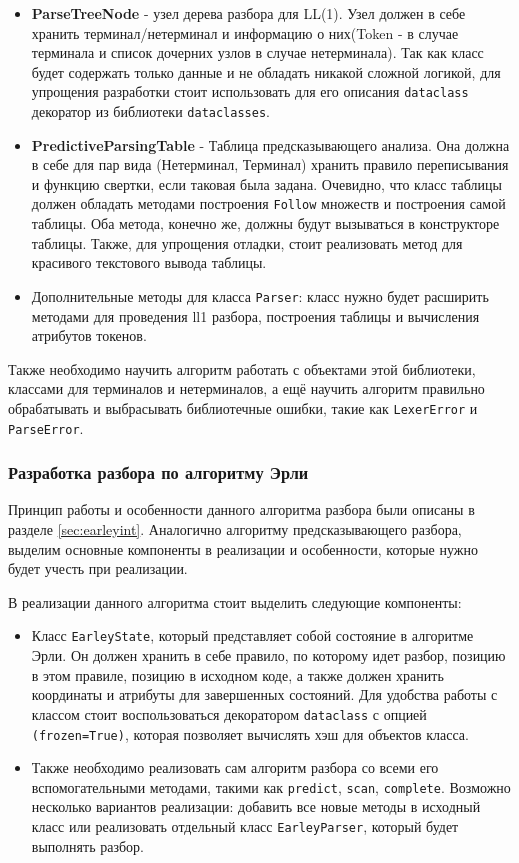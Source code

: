 \documentclass[14pt, russian]{scrartcl}
\begin{document}
\begin{itemize}
	\item \textbf{ParseTreeNode} - узел дерева разбора для LL(1). Узел должен в себе хранить терминал/нетерминал
	и информацию о них(Token - в случае терминала и список дочерних узлов в случае нетерминала). Так как класс будет
	содержать только данные и не обладать никакой сложной логикой, для упрощения разработки стоит использовать для его
	описания \texttt{dataclass} декоратор из библиотеки \texttt{dataclasses}.
	\item \textbf{PredictiveParsingTable} - Таблица предсказывающего анализа. Она должна в себе для пар вида
	(Нетерминал, Терминал) хранить правило переписывания и функцию свертки, если таковая была задана. Очевидно,
	что класс таблицы должен обладать методами построения \texttt{Follow} множеств и построения самой таблицы.
	Оба метода, конечно же, должны будут вызываться в конструкторе таблицы. Также, для упрощения отладки, стоит
	реализовать метод для красивого текстового вывода таблицы.
	\item Дополнительные методы для класса \texttt{Parser}: класс нужно будет расширить методами для проведения ll1 разбора,
	построения таблицы и вычисления атрибутов токенов.
\end{itemize}

Также необходимо научить алгоритм работать с объектами этой библиотеки, классами для терминалов и нетерминалов, а ещё
научить алгоритм правильно обрабатывать и выбрасывать библиотечные ошибки, такие как \texttt{LexerError} и \texttt{ParseError}.

\subsubsection{Разработка разбора по алгоритму Эрли}

Принцип работы и особенности данного алгоритма разбора были описаны в разделе \ref{sec:earleyint}. Аналогично
алгоритму предсказывающего разбора, выделим основные компоненты в реализации и особенности, которые нужно будет учесть
при реализации.

В реализации данного алгоритма стоит выделить следующие компоненты:

\begin{itemize}
	\item Класс \texttt{EarleyState}, который представляет собой состояние в алгоритме Эрли. Он должен хранить в себе
	правило, по которому идет разбор, позицию в этом правиле, позицию в исходном коде, а также должен хранить
	координаты и атрибуты для завершенных состояний. Для удобства работы с классом стоит воспользоваться декоратором
	\texttt{dataclass} с опцией \texttt{(frozen=True)}, которая позволяет вычислять хэш для объектов класса.
	\item Также необходимо реализовать сам алгоритм разбора со всеми его вспомогательными методами, такими как
	\texttt{predict}, \texttt{scan}, \texttt{complete}. Возможно несколько вариантов реализации:
	добавить все новые методы в исходный класс или реализовать отдельный класс \texttt{EarleyParser}, который будет
	выполнять разбор.
\end{itemize}
\end{document}
